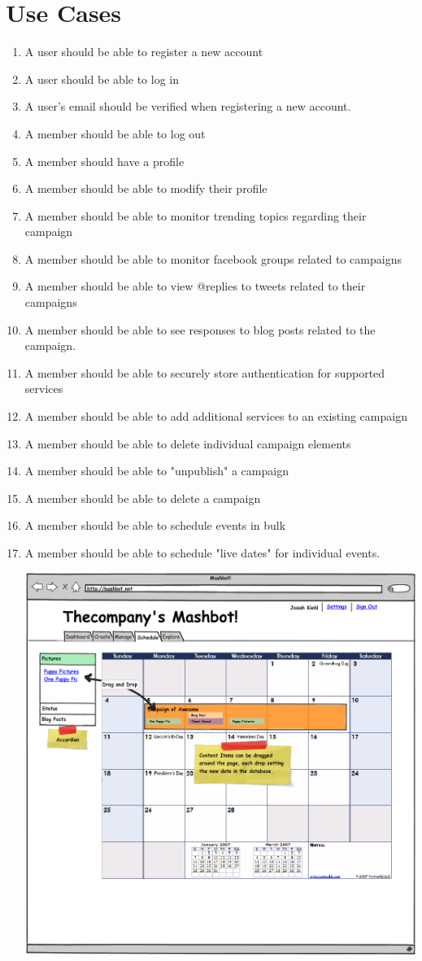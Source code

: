 \documentclass{article}
\begin{document}
\section{Use Cases} %
\begin{enumerate}
\item A user should be able to register a new account
\item A user should be able to log in
\item A user's email should be verified when registering a new
  account.
\item A member should be able to log out
\item A member should have a profile
\item A member should be able to modify their profile
\item A member should be able to monitor trending topics regarding
  their campaign
\item A member should be able to monitor facebook groups related to
  campaigns
\item A member should be able to view @replies to tweets related to
  their campaigns
\item A member should be able to see responses to blog posts related
  to the campaign.
\item A member should be able to securely store authentication for supported
  services
\item A member should be able to add additional services to an
  existing campaign
\item A member should be able to delete individual campaign elements
\item A member should be able to "unpublish" a campaign
\item A member should be able to delete a campaign
\item A member should be able to schedule events in bulk
\item A member should be able to schedule "live dates" for individual
  events.
\begin{center}
  \includegraphics[width=\textwidth]{../mockups/schedule-content.png}

\end{center}
\end{enumerate}
\end{document}
